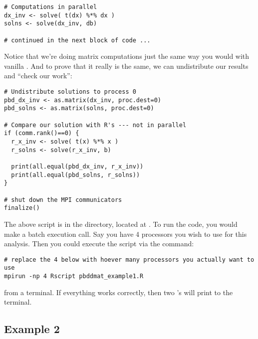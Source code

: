 \begin{lstlisting}[language=rr,title=Simple Matrix Operations]
# Computations in parallel
dx_inv <- solve( t(dx) %*% dx )
solns <- solve(dx_inv, db)

# continued in the next block of code ...
\end{lstlisting}

Notice that we're doing matrix computations just the same way you would with vanilla .  And to prove that it really is the same, we can undistribute our results and ``check our work'':

\begin{lstlisting}[language=rr,title=Comparing Results to \proglang{R}]
# Undistribute solutions to process 0
pbd_dx_inv <- as.matrix(dx_inv, proc.dest=0)
pbd_solns <- as.matrix(solns, proc.dest=0)

# Compare our solution with R's --- not in parallel
if (comm.rank()==0) {
  r_x_inv <- solve( t(x) %*% x )
  r_solns <- solve(r_x_inv, b)
  
  print(all.equal(pbd_dx_inv, r_x_inv))
  print(all.equal(pbd_solns, r_solns))
}

# shut down the MPI communicators
finalize()
\end{lstlisting}

The above script is in the  directory, located at .  To run the code, you would make a batch execution call.  Say you have 4 processors you wish to use for this analysis.  Then you could execute the script via the command:

\begin{lstlisting}
# replace the 4 below with hoever many processors you actually want to use
mpirun -np 4 Rscript pbddmat_example1.R
\end{lstlisting}

from a terminal.  If everything works correctly, then two 's will print to the terminal.



















\subsection[]{Example 2}

